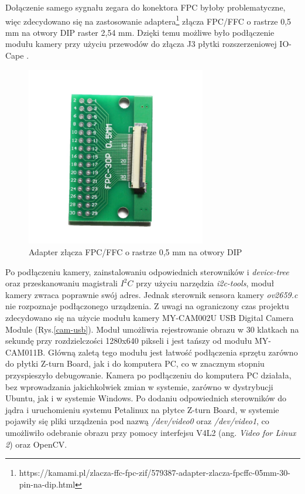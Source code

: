 Dołączenie samego sygnału zegara do konektora FPC byłoby problematyczne, więc zdecydowano się na zastosowanie adaptera\footnote{https://kamami.pl/zlacza-ffc-fpc-zif/579387-adapter-zlacza-fpcffc-05mm-30-pin-na-dip.html} złącza FPC/FFC o rastrze 0,5 mm na otwory DIP raster 2,54 mm. Dzięki temu możliwe było podłączenie modułu kamery przy użyciu przewodów do złącza J3 płytki rozszerzeniowej IO-Cape \cite{ZturnIOCapeSchematic}.


\begin{figure}[!h]
  \centering
  \includegraphics[width=0.7\textwidth]{img/dvp-adapter.jpg}
  \caption{Adapter złącza FPC/FFC o rastrze 0,5 mm na otwory DIP}
  \label{cam-schematic}
\end{figure}


Po podłączeniu kamery, zainstalowaniu odpowiednich sterowników i \emph{device-tree} oraz przeskanowaniu magistrali $I^2C$ przy użyciu narzędzia \emph{i2c-tools}, moduł kamery zwraca poprawnie swój adres. Jednak sterownik sensora kamery \emph{ov2659.c} nie rozpoznaje podłączonego urządzenia. Z uwagi na ograniczony czas projektu zdecydowano się na użycie modułu kamery MY-CAM002U USB Digital Camera Module (Rys.\ref{cam-usb}). Moduł umożliwia rejestrowanie obrazu w 30 klatkach na sekundę przy rozdzielczości 1280x640 pikseli i jest tańszy od modułu MY-CAM011B. Główną zaletą tego modułu jest łatwość podłączenia sprzętu zarówno do płytki Z-turn Board, jak i do komputera PC, co w znacznym stopniu przyspieszyło debugowanie. Kamera po podłączeniu do komputera PC działała, bez wprowadzania jakichkolwiek zmian w systemie, zarówno w dystrybucji Ubuntu, jak i w systemie Windows. Po dodaniu odpowiednich sterowników do jądra i uruchomieniu systemu Petalinux na płytce Z-turn Board, w systemie pojawiły się pliki urządzenia pod nazwą \emph{/dev/video0} oraz \emph{/dev/video1}, co umożliwiło odebranie obrazu przy pomocy interfejsu V4L2 (ang. \emph{Video for Linux 2}) oraz OpenCV.


